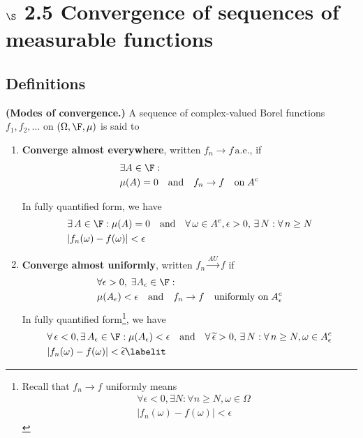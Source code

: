 \documentclass{article} %
\newcommand{\epsilontilde}{\widetilde{\epsilon}}
\begin{document}
\section{$\S$ 2.5 Convergence of sequences of measurable functions}

\subsection{Definitions}

\begin{definition}{\textbf{(Modes of convergence.)}}
A sequence of complex-valued Borel functions $f_1, f_2, \hdots$ on $(\Omega, \F, \mu)$ is said to
\begin{enumerate}
\item \textbf{Converge almost everywhere}, written $f_n \to f \, \text{a.e.}$, if
\begin{align*} 
& \exists A \in \F : \\
& \mu(A) =0 \quad \text{and} \quad f_n \to f \quad \text{on} \; A^c 	
\end{align*}

In fully quantified form, we have 
\begin{align*}
 &\exists \, A \in \F : \mu(A) =0  \quad \text{and} \quad \forall \, \omega \in A^c, \epsilon >0, \, \exists \, N : \forall \, n \geq N \\
 & |f_n(\omega) - f(\omega)| < \epsilon 	
\end{align*}
\item \textbf{Converge almost uniformly}, written $f_n \stackrel{AU}{\to} f$ if 
\begin{align*} 
& \forall \epsilon >0, \; \exists A_\epsilon \in \F : \\
& \mu(A_\epsilon) < \epsilon \quad \text{and} \quad f_n \to f \quad \text{uniformly on} \; A_\epsilon^c 	
\end{align*} 
In fully quantified form\footnote{Recall that $f_n \to f$ uniformly means 
\begin{align*}
&\forall \epsilon <0, \exists N : \forall n \geq N, \omega \in \Omega \\
& |f_n(\omega) - f(\omega) | < \epsilon 	
\end{align*}
}, we have 
\begin{align*}
&\forall \, \epsilon <0, \exists \, A_\epsilon \in \F : \mu(A_\epsilon) < \epsilon \quad \text{and} \quad \forall \, \epsilontilde >0, \, \exists \, N : \forall \, n \geq N, \omega \in A_\epsilon^c \\
& |f_n(\omega) - f(\omega) | < \epsilontilde 
\labelit \label{eqn:def_of_convergence_almost_uniformly_in_quantified_form}	
\end{align*}
 


\end{enumerate}
\end{definition}
\end{document}
